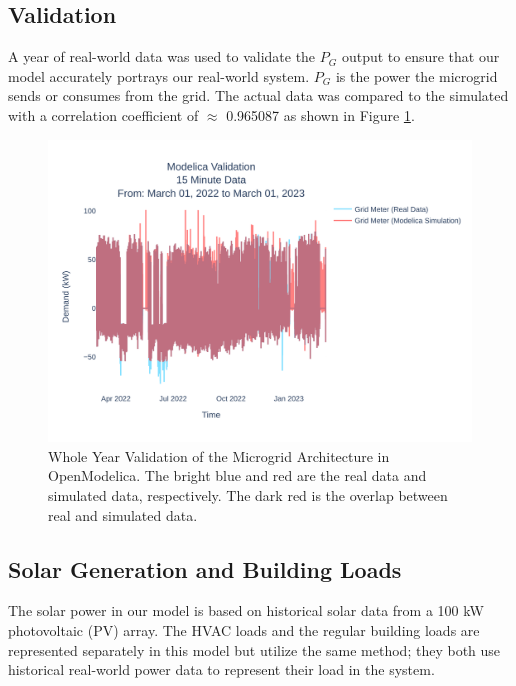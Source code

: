 \documentclass[conference,  usletter]{IEEEtran}
\begin{document}
	\subsection{Validation}
A year of real-world data was used to validate the $P_G $ output to ensure that our model accurately portrays our real-world system. $P_G$ is the power the microgrid sends or consumes from the grid. The actual data was compared to the simulated with a correlation coefficient of  $\approx$ 0.965087 as shown in Figure \ref{fig:ucr15minutedatamar012022tomar012023}. 
\begin{figure}
	\centering
	\includegraphics[width=0.9\linewidth]{Fig/ucr_15_Minute_Data_Mar_01_2022_to_Mar_01_2023}
	\caption{\footnotesize Whole Year Validation of the Microgrid Architecture in OpenModelica. The bright blue and red are the real data and simulated data, respectively. The dark red is the overlap between real and simulated data.} %
\label{fig:ucr15minutedatamar012022tomar012023}
\end{figure}
\subsection{Solar Generation and Building Loads}
The solar power in our model is based on historical solar data from a 100 kW photovoltaic (PV) array. The HVAC loads and the regular building loads are represented separately in this model but utilize the same method; they both use historical real-world power data to represent their load in the system. 
\end{document}
